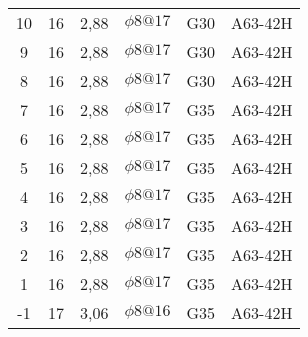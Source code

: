 \begin{table}[H]
\begin{tabular}{ccrlcc}
            10    & 16    & 2,88  & $\phi8@17$ & G30   & A63-42H \\
            9     & 16    & 2,88  & $\phi8@17$ & G30   & A63-42H \\
            8     & 16    & 2,88  & $\phi8@17$ & G30   & A63-42H \\
            7     & 16    & 2,88  & $\phi8@17$ & G35   & A63-42H \\
            6     & 16    & 2,88  & $\phi8@17$ & G35   & A63-42H \\
            5     & 16    & 2,88  & $\phi8@17$ & G35   & A63-42H \\
            4     & 16    & 2,88  & $\phi8@17$ & G35   & A63-42H \\
            3     & 16    & 2,88  & $\phi8@17$ & G35   & A63-42H \\
            2     & 16    & 2,88  & $\phi8@17$ & G35   & A63-42H \\
            1     & 16    & 2,88  & $\phi8@17$ & G35   & A63-42H \\
            -1    & 17    & 3,06  & $\phi8@16$ & G35   & A63-42H \bigstrut[b]\\
            \hline
        \end{tabular}%
      \label{materiales}%
    \end{table}%